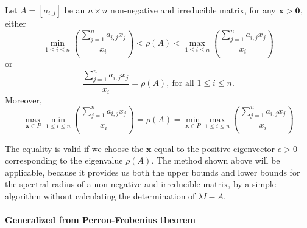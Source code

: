\begin{thm}
Let $A=\left[a_{i,j}\right]$ be an $n\times n$ non-negative and
irreducible matrix, for any $\mathbf{x}>\mathbf{0}$, either
\begin{equation}
\min_{1\leq i\leq n}\left(\frac{\sum_{j=1}^{n}a_{i,j}x_{j}}{x_{i}}\right)<\rho\left(A\right)<\max_{1\leq i\leq n}\left(\frac{\sum_{j=1}^{n}a_{i,j}x_{j}}{x_{i}}\right)
\end{equation}
or 
\begin{equation}
\frac{\sum_{j=1}^{n}a_{i,j}x_{j}}{x_{i}}=\rho\left(A\right),\ \mbox{for all }1\leq i\leq n.
\end{equation}
Moreover,
\begin{equation}
\max_{\mathbf{x}\in P}\min_{1\leq i\leq n}\left(\frac{\sum_{j=1}^{n}a_{i,j}x_{j}}{x_{i}}\right)=\rho\left(A\right)=\min_{\mathbf{x}\in P}\max_{1\leq i\leq n}\left(\frac{\sum_{j=1}^{n}a_{i,j}x_{j}}{x_{i}}\right)
\end{equation}

\end{thm}
The equality is valid if we choose the $\mathbf{x}$ equal to the
positive eigenvector $e>0$ corresponding to the eigenvalue $\rho\left(A\right)$.
The method shown above will be applicable, because it provides us
both the upper bounds and lower bounds for the spectral radius of
a non-negative and irreducible matrix, by a simple algorithm without
calculating the determination of $\lambda I-A$. 


\paragraph{Generalized from Perron-Frobenius theorem}

